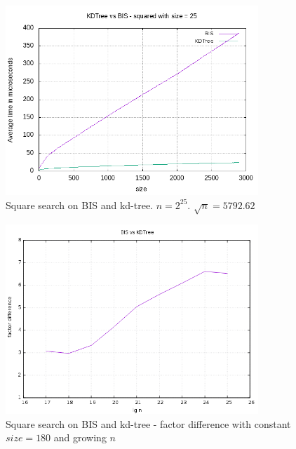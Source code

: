 \begin{figure}[h]
    \centering
    \includegraphics[width = 0.85\textwidth]{pictures/analysis/sqrt_25.png}
    \caption{Square search on BIS and kd-tree. $n=2^{25}$. $\sqrt{n} = 5792.62$}\label{fig:sqrt_25}
\end{figure}


\begin{figure}[h]
    \centering
    \includegraphics[width = 0.85\textwidth]{pictures/analysis/factor_difference_sqrtn_180.png}
    \caption{Square search on BIS and kd-tree - factor difference with constant $size = 180$ and growing $n$}\label{fig:factdiffsqrt180}
\end{figure}

